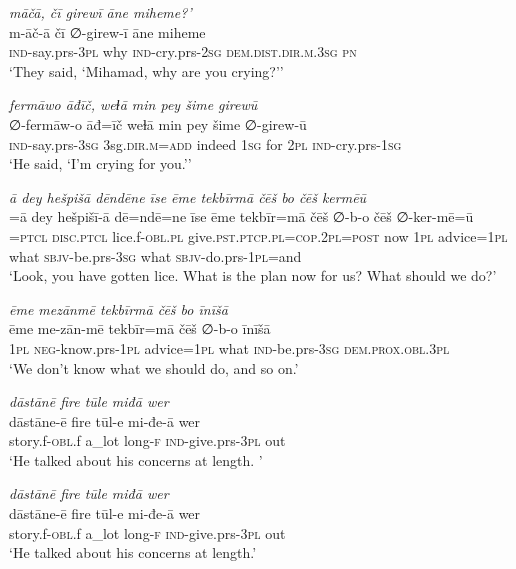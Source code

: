 \ea \label{BP.154}
\textit{māčā, čī girewī āne miheme?’} \\ 
\gll m-āč-ā čī ∅-girew-ī āne miheme \\ 
 \textsc{ind-}say.prs\textsc{-3pl} why \textsc{ind-}cry.prs-\textsc{2sg} \textsc{dem.dist}\textsc{.dir}\textsc{.m}\textsc{.3sg} \textsc{pn} \\ 
\glt `They said, ‘Mihamad, why are you crying?’'
\z 
 
\ea \label{BP.155}
\textit{fermāwo āđīč, weɫā min pey šime girewū} \\ 
\gll ∅-fermāw-o āđ=īč weɫā min pey šime ∅-girew-ū \\ 
 \textsc{ind-}say.prs\textsc{-3sg} 3sg\textsc{.dir}\textsc{.m}\textsc{=add} indeed \textsc{1sg} for \textsc{2pl} \textsc{ind-}cry.prs\textsc{-\textsc{1sg}} \\ 
\glt `He said, ‘I’m crying for you.’'
\z 
 
\ea \label{BP.156}
\textit{ā dey hešpišā dēndēne īse ēme tekbīrmā čēš bo čēš kermēū} \\ 
\gll =ā dey hešpišī-ā dē=ndē=ne īse ēme tekbīr=mā čēš ∅-b-o čēš ∅-ker-mē=ū \\ 
=\textsc{ptcl} \textsc{disc.ptcl} lice.f\textsc{-obl}\textsc{.pl} give\textsc{.pst}\textsc{.ptcp}\textsc{.pl}\textsc{=cop}.\textsc{2pl}\textsc{=\textsc{post}} now \textsc{1pl} advice\textsc{=\textsc{1pl}} what \textsc{sbjv-}be.prs\textsc{-3sg} what \textsc{sbjv-}do.prs\textsc{-\textsc{1pl}}=and \\ 
\glt `Look, you have gotten lice. What is the plan now for us? What should we do?'
\z 
 
\ea \label{BP.157}
\textit{ēme mezānmē tekbīrmā čēš bo īnīšā} \\ 
\gll ēme me-zān-mē tekbīr=mā čēš ∅-b-o īnīšā \\ 
 \textsc{1pl} \textsc{neg-}know.prs\textsc{-\textsc{1pl}} advice\textsc{=\textsc{1pl}} what \textsc{ind-}be.prs\textsc{-3sg} \textsc{dem.prox}\textsc{.obl}\textsc{.3pl} \\ 
\glt `We don’t know what we should do, and so on.'
\z 
 
\ea \label{BP.158}
\textit{dāstānē fire tūle miđā wer} \\ 
\gll dāstāne-ē fire tūl-e mi-đe-ā wer \\ 
 story.f\textsc{-obl}.f a\_lot long\textsc{-f} \textsc{ind-}give.prs\textsc{-3pl} out \\ 
\glt `He talked about his concerns at length. '
\z 
 
\ea \label{BP.159}
\textit{dāstānē fire tūle miđā wer} \\ 
\gll dāstāne-ē fire tūl-e mi-đe-ā wer \\ 
 story.f\textsc{-obl}.f a\_lot long\textsc{-f} \textsc{ind-}give.prs\textsc{-3pl} out \\ 
\glt `He talked about his concerns at length.'
\z 
 

